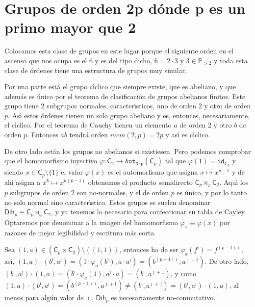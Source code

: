 \documentclass[final,12pt,a4paper,twoside,fleqn]{extbook}
\newcommand{\setP}{\ensuremath{}\mathbb{P}}
\newcommand{\graut}[1]{\ensuremath{{\mathtt{Aut}}_{\mathtt{Grp}}{\left({#1}\right)}}}
\newcommand{\grclass}[1]{\ensuremath{\mathsf{#1}}}
\newcommand{\cyclicgr}[1]{\ensuremath{{\grclass{C}}_{#1}}}
\newcommand{\dihgr}[1]{\ensuremath{{\grclass{Dih}}_{#1}}}
\theoremstyle{definition}
\theoremstyle{remark}
\begin{document}
\chapter{Grupos de orden 2p d\'onde p es un primo mayor que 2}

Colocamos esta clase de grupos en este lugar porque el siguiente orden en el ascenso que nos ocupa es el $6$ y es del tipo dicho, $6=2·3$ y
$3      \in \setP_{>2}$ y toda esta clase de \'ordenes tiene una estructura de grupos muy similar.

Por una parte est\'a el grupo c{\'{\i}}clico que siempre existe, que es abeliano, y que adem\'as es \'unico por el teorema de clasificaci\'on
de grupos abelianos finitos. Este grupo tiene $2$ subgrupos normales, caracter{\'{\i}}sticos, uno de orden $2$ y otro de orden $p$. As{\'{\i}}
estos \'ordenes tienen un solo grupo abeliano y es, entonces, necesariamente, el c{\'{\i}}clico. Por el teorema de Cauchy tienen un elemento
$a$ de orden $2$ y otro $b$ de orden $p$. Entonces $ab$ tendr\'a orden $mcm(2,p)=2p$ y as{\'{\i}} es c{\'{\i}}clico.

De otro lado est\'an los grupos no abelianos si existiesen. Pero podemos comprobar que el homomorfismo inyectivo
$\varphi : \cyclicgr{2}       \longrightarrow       \graut{\cyclicgr{p}}$ tal que $\varphi (1)={\mathtt{id}}_{\cyclicgr{p}}$ y siendo
$x       \in {\cyclicgr{p}}\setminus\{1\}$ el valor $\varphi (x)$ es el automorfismo que asigna $x       \mapsto x^{p-1}$ y de ah{\'{\i}} asigna a
$x^k       \mapsto x^{k(p-1)}$ obtenemos el producto semidirecto $\cyclicgr{p} {\rtimes}_{\varphi } \cyclicgr{2}$. Aqu{\'{\i}} los $p$ subgrupos
de orden $2$ son no-normales, y el de orden $p$ es \'unico, y por lo tanto no solo normal sino caracter{\'{\i}}stico.
Estos grupos se suelen denominar $\dihgr{p}       \equiv       \cyclicgr{p} {{\rtimes}_{\varphi }} \cyclicgr{2}$, y ya tenemos lo necesario
para confeccionar su tabla de Cayley. Optaremos por denominar a la imagen del homomorfismo $\varphi_x       \equiv       \varphi (x)$ por razones
de mejor legibilidad y escritura m\'as corta.

Sea $(1,a)        \in \left(\cyclicgr{p}      \times      \cyclicgr{2}\right)\setminus\left\lbrace{(1,1)}\right\rbrace$, entonces ha de ser $\varphi_{a}(f^\imath)=f^{(p-1)\imath}$,
 as{\'{\i}}, $(1,a)·(b^\imath,a^\jmath)=(1·\varphi_a (b^\imath),a       \cdot a^\jmath)=(b^{(p-1)\imath},a^{\jmath + 1})$.
 De otro lado, $(b^\imath,a^\jmath)             \cdot (1,a)=(b^\imath ·\varphi_a (1),a^\jmath ·a)=(b^{\imath},a^{\jmath + 1})$,
 y como $(1,a)       \cdot (b^\imath,a^\jmath)=(b^{(p-1)\imath},a^{\jmath + 1})       \neq      (b^{\imath},a^{\jmath + 1}) = (b^\imath,a^\jmath)·(1,a)$,
 al menos para alg\'un valor de $\imath$, $\dihgr{p}$ es necesariamente no-conmutativo.
\end{document}
